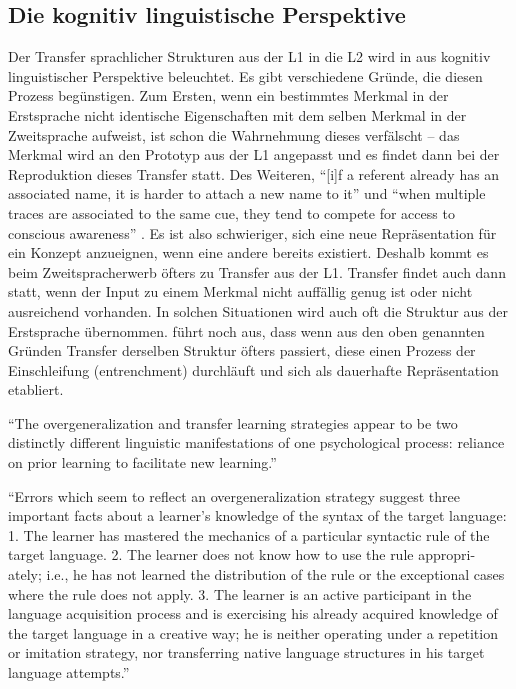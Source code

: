 \subsection{Die kognitiv linguistische Perspektive}
Der Transfer sprachlicher Strukturen aus der L1 in die L2 wird in \cite{Ellis06} aus kognitiv linguistischer Perspektive beleuchtet.
Es gibt verschiedene Gründe, die diesen Prozess begünstigen.
Zum Ersten, wenn ein bestimmtes Merkmal in der Erstsprache nicht identische Eigenschaften mit dem selben Merkmal in der Zweitsprache aufweist, ist schon die Wahrnehmung dieses verfälscht --
das Merkmal wird an den Prototyp aus der L1 angepasst und es findet dann bei der Reproduktion dieses Transfer statt.
Des Weiteren, ``[i]f a referent already has an associated name, it is harder to attach a new name to it'' und
``when multiple traces are associated to the same cue, they tend to compete for access to conscious awareness'' \cite{Ellis06}.
Es ist also schwieriger, sich eine neue Repräsentation für ein Konzept anzueignen, wenn eine andere bereits existiert.
Deshalb kommt es beim Zweitspracherwerb öfters zu Transfer aus der L1.
Transfer findet auch dann statt, wenn der Input zu einem Merkmal nicht auffällig genug ist oder nicht ausreichend vorhanden.
In solchen Situationen wird auch oft die Struktur aus der Erstsprache übernommen.
\cite{Ellis06} führt noch aus, dass wenn aus den oben genannten Gründen Transfer derselben Struktur öfters passiert, diese einen Prozess der Einschleifung (entrenchment) durchläuft und sich als dauerhafte Repräsentation etabliert.



\cite{Taylor75}
``The overgeneralization and transfer learning strategies
appear to be two distinctly different linguistic manifestations of
one psychological process: reliance on prior learning to facilitate
new learning.''

``Errors which seem to reflect an
overgeneralization strategy suggest three important facts about a
learner’s knowledge of the syntax of the target language:
1. The learner has mastered the mechanics of a particular
syntactic rule of the target language.
2. The learner does not know how to use the rule appropri-
ately; i.e., he has not learned the distribution of the rule or the
exceptional cases where the rule does not apply.
3. The learner is an active participant in the language
acquisition process and is exercising his already acquired knowledge
of the target language in a creative way; he is neither operating
under a repetition or imitation strategy, nor transferring native
language structures in his target language attempts.''


